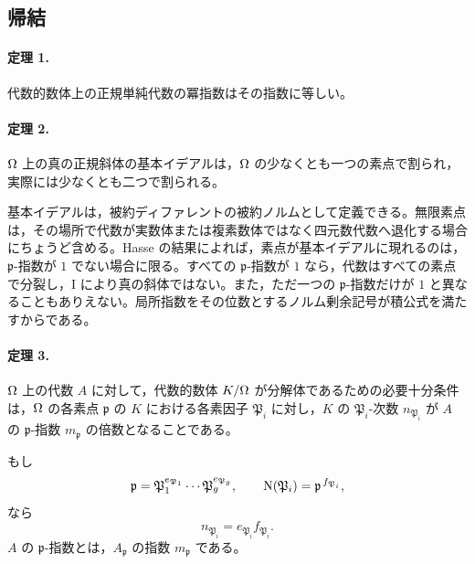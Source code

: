 \subsection*{帰結}

\paragraph{定理 1.}
代数的数体上の正規単純代数の冪指数はその指数に等しい。

\paragraph{定理 2.}
\(\Omega\) 上の真の正規斜体の基本イデアルは，\(\Omega\) の少なくとも一つの素点で割られ，実際には少なくとも二つで割られる。

基本イデアルは，被約ディファレントの被約ノルムとして定義できる。無限素点は，その場所で代数が実数体または複素数体ではなく四元数代数へ退化する場合にちょうど含める。Hasse の結果によれば，素点が基本イデアルに現れるのは，\(\mathfrak p\)-指数が \(1\) でない場合に限る。すべての \(\mathfrak p\)-指数が \(1\) なら，代数はすべての素点で分裂し，I により真の斜体ではない。また，ただ一つの \(\mathfrak p\)-指数だけが \(1\) と異なることもありえない。局所指数をその位数とするノルム剰余記号が積公式を満たすからである。

\paragraph{定理 3.}
\(\Omega\) 上の代数 \(A\) に対して，代数的数体 \(K/\Omega\) が分解体であるための必要十分条件は，\(\Omega\) の各素点 \(\mathfrak p\) の \(K\) における各素因子 \(\mathfrak P_i\) に対し，\(K\) の \(\mathfrak P_i\)-次数 \(n_{\mathfrak P_i}\) が \(A\) の \(\mathfrak p\)-指数 \(m_{\mathfrak p}\) の倍数となることである。

もし
\[
        \mathfrak p=\mathfrak P_1^{e_{\mathfrak P_1}}\cdots
        \mathfrak P_g^{e_{\mathfrak P_g}},
        \qquad
        \operatorname{N}(\mathfrak P_i)=\mathfrak p^{\,f_{\mathfrak P_i}},
\]
なら
\[
        n_{\mathfrak P_i}=e_{\mathfrak P_i}f_{\mathfrak P_i}.
\]
\(A\) の \(\mathfrak p\)-指数とは，\(A_{\mathfrak p}\) の指数 \(m_{\mathfrak p}\) である。

